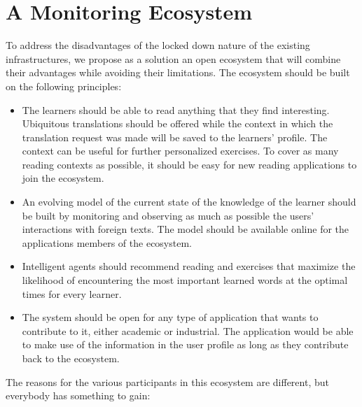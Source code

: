 

\section {A Monitoring Ecosystem}

To address the disadvantages of the locked down nature of the existing infrastructures, we propose as a solution an open ecosystem that will combine their advantages while avoiding their limitations. The ecosystem should be built on the following principles:

\begin{itemize}

	\item The learners should be able to read anything that they find interesting. Ubiquitous translations should be offered while the context in which the translation request was made will be saved to the learners' profile. The context can be useful for further personalized exercises. To cover as many reading contexts as possible, it should be easy for new reading applications to join the ecosystem.

	\item An evolving model of the current state of the knowledge of the learner should be built by monitoring and observing as much as possible the users' interactions with foreign texts. The model should be available online for the applications members of the ecosystem.

	\item Intelligent agents should recommend reading and exercises that maximize the likelihood of encountering the most important learned words at the optimal times for every learner.

	\item The system should be open for any type of application that wants to contribute to it, either academic or industrial. The application would be able to make use of the information in the user profile as long as they contribute back to the ecosystem. 

\end{itemize}

The reasons for the various participants in this ecosystem are different, but everybody has something to gain: 

